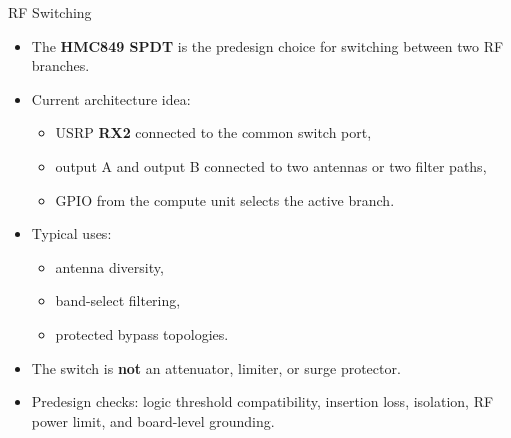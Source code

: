 \documentclass{beamer}
\begin{document}
\begin{frame}{RF Switching}
    \small
    \begin{itemize}
        \item The \textbf{HMC849 SPDT} is the predesign choice for switching between two RF branches.
        \item Current architecture idea:
        \begin{itemize}
            \item USRP \textbf{RX2} connected to the common switch port,
            \item output A and output B connected to two antennas or two filter paths,
            \item GPIO from the compute unit selects the active branch.
        \end{itemize}
        \item Typical uses:
        \begin{itemize}
            \item antenna diversity,
            \item band-select filtering,
            \item protected bypass topologies.
        \end{itemize}
        \item The switch is \textbf{not} an attenuator, limiter, or surge protector.
        \item Predesign checks: logic threshold compatibility, insertion loss, isolation, RF power limit, and board-level grounding.
    \end{itemize}
\end{frame}
\end{document}
